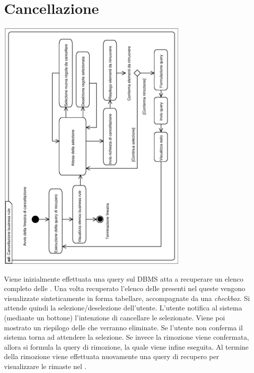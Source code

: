 \documentclass[11pt,titlepage,a4paper]{report}
\begin{document}
\section{Cancellazione \br}
\begin{center}
 \includegraphics[width=0.7\textwidth, angle=-90]{CancellazioneBusinessRule.eps}
\end{center}
Viene inizialmente effettuata una query sul DBMS atta a recuperare un elenco completo delle \brs . Una volta recuperato l'elenco delle \brs presenti nel \re queste vengono visualizzate sinteticamente in forma tabellare, accompagnate da una \textit{checkbox}. Si attende quindi la selezione/deselezione dell'utente. L'utente notifica al sistema (mediante un bottone) l'intenzione di cancellare le \brs selezionate.  Viene poi mostrato un riepilogo delle \brs che verranno eliminate. Se l'utente non conferma il sistema torna ad attendere la selezione. Se invece la rimozione viene confermata, allora si formula la query di rimozione, la quale viene infine eseguita. Al termine della rimozione viene effettuata nuovamente una query di recupero per visualizzare le \brs rimaste nel \re.


\end{document}
